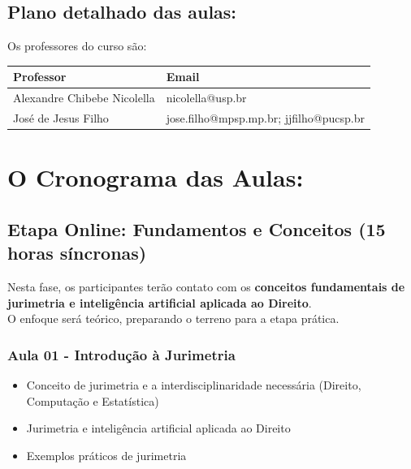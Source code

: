 \documentclass[
  letterpaper,
  DIV=11,
  numbers=noendperiod]{scrreprt}
\providecommand{\tightlist}{%
  \setlength{\itemsep}{0pt}\setlength{\parskip}{0pt}}
\begin{document}
\section{\texorpdfstring{\textbf{Plano detalhado das
aulas:}}{Plano detalhado das aulas:}}\label{plano-detalhado-das-aulas}

Os professores do curso são:

\begin{longtable}[]{@{}ll@{}}
\toprule\noalign{}
Professor & Email \\
\midrule\noalign{}
\endhead
\bottomrule\noalign{}
\endlastfoot
Alexandre Chibebe Nicolella & nicolella@usp.br \\
José de Jesus Filho & jose.filho@mpsp.mp.br; jjfilho@pucsp.br \\
\end{longtable}


\chapter{O Cronograma das Aulas:}\label{o-cronograma-das-aulas}

\section{Etapa Online: Fundamentos e Conceitos (15 horas
síncronas)}\label{etapa-online-fundamentos-e-conceitos-15-horas-suxedncronas}

Nesta fase, os participantes terão contato com os \textbf{conceitos
fundamentais de jurimetria e inteligência artificial aplicada ao
Direito}.\\
O enfoque será teórico, preparando o terreno para a etapa prática.

\subsection{Aula 01 - Introdução à
Jurimetria}\label{aula-01---introduuxe7uxe3o-uxe0-jurimetria}

\begin{itemize}
\tightlist
\item
  Conceito de jurimetria e a interdisciplinaridade necessária (Direito,
  Computação e Estatística)\\
\item
  Jurimetria e inteligência artificial aplicada ao Direito\\
\item
  Exemplos práticos de jurimetria
\end{itemize}
\end{document}
